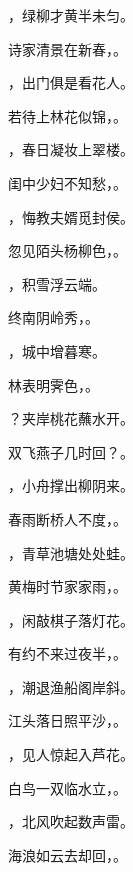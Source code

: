 \documentclass[12pt, a4paper, addpoints]{exam}
\begin{document}
\begin{questions}
\question[1] \uline{\qquad\qquad\qquad}，绿柳才黄半未匀。

\question[1] 诗家清景在新春，\uline{\qquad\qquad\qquad}。

\question[1] \uline{\qquad\qquad\qquad}，出门俱是看花人。

\question[1] 若待上林花似锦，\uline{\qquad\qquad\qquad}。

\question[1] \uline{\qquad\qquad\qquad}，春日凝妆上翠楼。

\question[1] 闺中少妇不知愁，\uline{\qquad\qquad\qquad}。

\question[1] \uline{\qquad\qquad\qquad}，悔教夫婿觅封侯。

\question[1] 忽见陌头杨柳色，\uline{\qquad\qquad\qquad}。

\question[1] \uline{\qquad\qquad\qquad}，积雪浮云端。

\question[1] 终南阴岭秀，\uline{\qquad\qquad\qquad}。

\question[1] \uline{\qquad\qquad\qquad}，城中增暮寒。

\question[1] 林表明霁色，\uline{\qquad\qquad\qquad}。

\question[1] \uline{\qquad\qquad\qquad}？夹岸桃花蘸水开。

\question[1] 双飞燕子几时回？\uline{\qquad\qquad\qquad}。

\question[1] \uline{\qquad\qquad\qquad}，小舟撑出柳阴来。

\question[1] 春雨断桥人不度，\uline{\qquad\qquad\qquad}。

\question[1] \uline{\qquad\qquad\qquad}，青草池塘处处蛙。

\question[1] 黄梅时节家家雨，\uline{\qquad\qquad\qquad}。

\question[1] \uline{\qquad\qquad\qquad}，闲敲棋子落灯花。

\question[1] 有约不来过夜半，\uline{\qquad\qquad\qquad}。

\question[1] \uline{\qquad\qquad\qquad}，潮退渔船阁岸斜。

\question[1] 江头落日照平沙，\uline{\qquad\qquad\qquad}。

\question[1] \uline{\qquad\qquad\qquad}，见人惊起入芦花。

\question[1] 白鸟一双临水立，\uline{\qquad\qquad\qquad}。

\question[1] \uline{\qquad\qquad\qquad}，北风吹起数声雷。

\question[1] 海浪如云去却回，\uline{\qquad\qquad\qquad}。


\end{questions}
\end{document}
